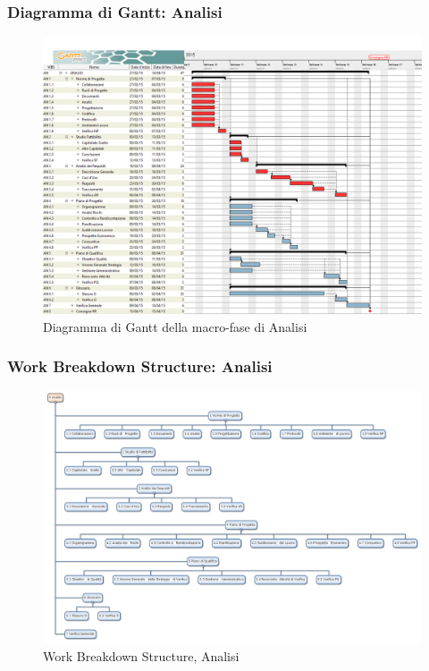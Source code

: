 \subsubsection{Diagramma di Gantt: Analisi}
\begin{figure}[h] 
	\centering
	\includegraphics[width=\textwidth]{./img/analisi.png}
	\caption{Diagramma di Gantt della macro-fase di Analisi}
	\label{fig1}
\end{figure}

\newpage
\subsubsection{Work Breakdown Structure: Analisi}
\begin{figure}[h]
	\centering
	\includegraphics[width=\textwidth]{./img/wbs_analisi.png}
	\caption{Work Breakdown Structure, Analisi}
\end{figure}


